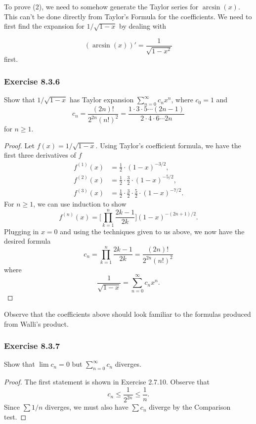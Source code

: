 To prove (2), we need to somehow generate the Taylor series for \( \arcsin(x)  \). This can't be done directly from Taylor's Formula for the coefficients. We need to first find the expansion for \( 1 / \sqrt{ 1 - x  }  \) by dealing with  





\[  (\arcsin(x))' = \frac{ 1 }{ \sqrt{ 1 - x^{2} }  } \] first. 
\subsubsection{Exercise 8.3.6} Show that \( 1 / \sqrt{ 1 - x  }  \) has Taylor expansion \( \sum_{ n=0 }^{ \infty  } c_{n} x^{n}  \), where \( c_{0} = 1  \) and 
\[  c_{n} = \frac{ (2n)!  }{  2^{2n} (n!)^{2}  } = \frac{ 1 \cdot 3 \cdot 5 \dotsb (2n-1) }{ 2 \cdot 4 \cdot 6 \dotsb 2n }  \] for \( n \geq 1  \).
\begin{proof}
Let \( f(x) = 1 / \sqrt{ 1 - x  }  \). Using Taylor's coefficient formula, we have the first three derivatives of \( f  \)
\begin{align*}
    f^{(1)}(x) &= \frac{ 1 }{ 2 } \cdot (1 - x )^{-3/2}, \\
    f^{(2)}(x) &= \frac{ 1  }{ 2 }  \cdot \frac{ 3 }{ 2 } \cdot  (1-x)^{-5/2}, \\
    f^{(3)}(x) &= \frac{ 1 }{ 2 }  \cdot \frac{ 3 }{ 2 }  \cdot \frac{ 5 }{ 2 } \cdot (1- x)^{-7/2}.
\end{align*}
For \( n  \geq 1 \), we can use induction to show  
\[  f^{(n)}(x) =  \Big[ \prod_{k=1}^{n} \frac{ 2k-1 }{ 2k }   \Big] (1 -x )^{-(2n+1)/2}. \] Plugging in \( x = 0  \) and using the techniques given to us above, we now have the desired formula
\[  c_{n} = \prod_{k=1}^{n} \frac{ 2k-1 }{ 2k } = \frac{ (2n)!  }{ 2^{2n}  (n!)^2   }  \] 
where 
\[  \frac{ 1 }{ \sqrt{ 1-x  }  }  = \sum_{ n=0 }^{ \infty  } c_{n} x^{n}. \]

\end{proof}

Observe that the coefficients above should look familiar to the formulas produced from Walli's product.

\subsubsection{Exercise 8.3.7} Show that \( \lim c_{n} =  0  \) but \( \sum_{ n=0  }^{ \infty  } c_{n}  \) diverges.
\begin{proof}
The first statement is shown in Exercise 2.7.10. Observe that 
\[  c_{n} \leq  \frac{ 1 }{ 2^{2n} } \leq \frac{ 1 }{ n }. \] Since \( \sum 1 / n  \) diverges, we must also have \( \sum c_{n}   \) diverge by the Comparison test. 
\end{proof}

